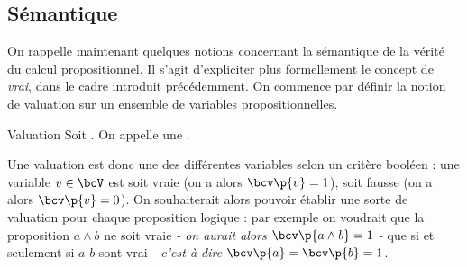     \subsection{Sémantique}
    
    On rappelle maintenant quelques notions concernant la sémantique de la vérité du calcul propositionnel. Il s'agit d'expliciter plus formellement le concept de \textit{vrai}, dans le cadre introduit précédemment. On commence par définir la notion de valuation sur un ensemble de variables propositionnelles.
    
    \begin{definition}{Valuation}{}
        Soit . On appelle  une .
    \end{definition}
    
    Une valuation est donc une  des différentes variables selon un critère booléen : une variable $v \in \bcV$ est soit vraie (on a alors $\bcv\p{v} = 1$), soit fausse (on a alors $\bcv\p{v} = 0$). On souhaiterait alors pouvoir établir une sorte de valuation pour chaque proposition logique : par exemple on voudrait que la proposition $a \land b$ ne soit vraie \textit{- on aurait alors $\bcv\p{a \land b} = 1$ -} que si et seulement si $a$  $b$ sont vrai \textit{- c'est-à-dire $\bcv\p{a} = \bcv\p{b} = 1$}.
    
